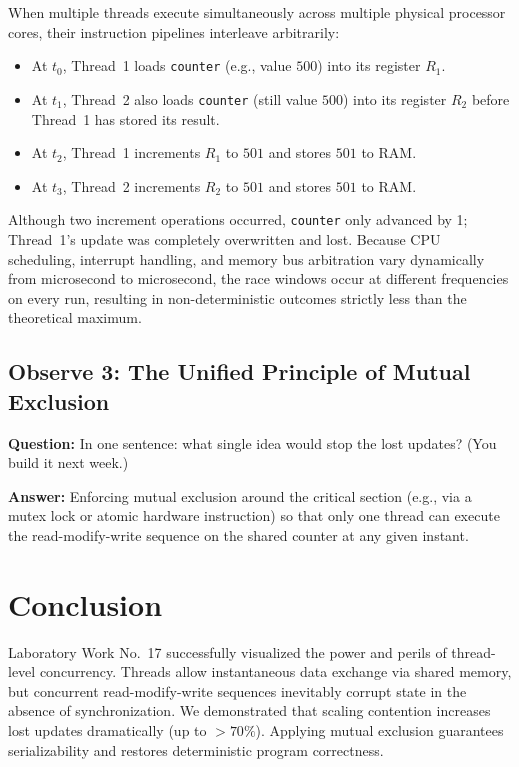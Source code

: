 \documentclass[12pt,a4paper]{article}
\begin{document}
When multiple threads execute simultaneously across multiple physical processor cores, their instruction pipelines interleave arbitrarily:
\begin{itemize}
    \item At $t_0$, Thread~1 loads \texttt{counter} (e.g., value $500$) into its register $R_1$.
    \item At $t_1$, Thread~2 also loads \texttt{counter} (still value $500$) into its register $R_2$ before Thread~1 has stored its result.
    \item At $t_2$, Thread~1 increments $R_1$ to $501$ and stores $501$ to RAM.
    \item At $t_3$, Thread~2 increments $R_2$ to $501$ and stores $501$ to RAM.
\end{itemize}
Although two increment operations occurred, \texttt{counter} only advanced by 1; Thread~1's update was completely overwritten and lost. Because CPU scheduling, interrupt handling, and memory bus arbitration vary dynamically from microsecond to microsecond, the race windows occur at different frequencies on every run, resulting in non-deterministic outcomes strictly less than the theoretical maximum.

\subsection{Observe 3: The Unified Principle of Mutual Exclusion}
\textbf{Question:} In one sentence: what single idea would stop the lost updates? (You build it next week.)

\textbf{Answer:}
Enforcing mutual exclusion around the critical section (e.g., via a mutex lock or atomic hardware instruction) so that only one thread can execute the read-modify-write sequence on the shared counter at any given instant.

\section{Conclusion}
Laboratory Work No.~17 successfully visualized the power and perils of thread-level concurrency. Threads allow instantaneous data exchange via shared memory, but concurrent read-modify-write sequences inevitably corrupt state in the absence of synchronization. We demonstrated that scaling contention increases lost updates dramatically (up to $>70\%$). Applying mutual exclusion guarantees serializability and restores deterministic program correctness.
\end{document}
